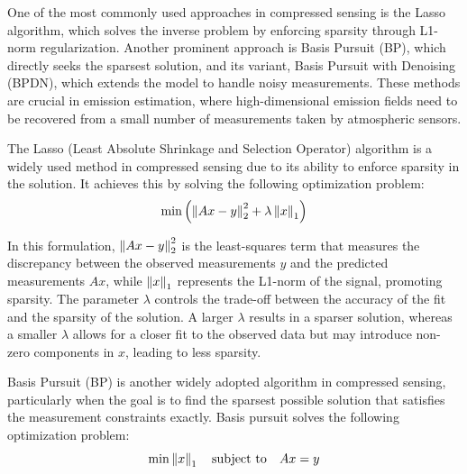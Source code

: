 One of the most commonly used approaches in compressed sensing is the Lasso algorithm, which solves the inverse problem by enforcing sparsity through L1-norm regularization.
Another prominent approach is Basis Pursuit (BP), which directly seeks the sparsest solution, and its variant, Basis Pursuit with Denoising (BPDN), which extends the model to handle noisy measurements.
These methods are crucial in emission estimation, where high-dimensional emission fields need to be recovered from a small number of measurements taken by atmospheric sensors.

The Lasso (Least Absolute Shrinkage and Selection Operator) algorithm is a widely used method in compressed sensing due to its ability to enforce sparsity in the solution.
It achieves this by solving the following optimization problem:
\begin{equation}
    \min{\left( \left\lVert Ax -y \right\rVert_2^2 + \lambda\left\lVert x\right\rVert_1 \right)}
\end{equation}

In this formulation, $\left\lVert Ax -y \right\rVert_2^2$ is the least-squares term that measures the discrepancy between the observed measurements $y$ and the predicted measurements $Ax$, while $\left\lVert x\right\rVert_1$ represents the L1-norm of the signal, promoting sparsity.
The parameter $\lambda$ controls the trade-off between the accuracy of the fit and the sparsity of the solution.
A larger $\lambda$ results in a sparser solution, whereas a smaller $\lambda$ allows for a closer fit to the observed data but may introduce non-zero components in $x$, leading to less sparsity.


Basis Pursuit (BP) is another widely adopted algorithm in compressed sensing, particularly when the goal is to find the sparsest possible solution that satisfies the measurement constraints exactly.
Basis pursuit solves the following optimization problem:
\begin{equation}
    \min \left\lVert x\right\rVert_1 \quad \text{subject to} \quad  Ax = y
\end{equation}

